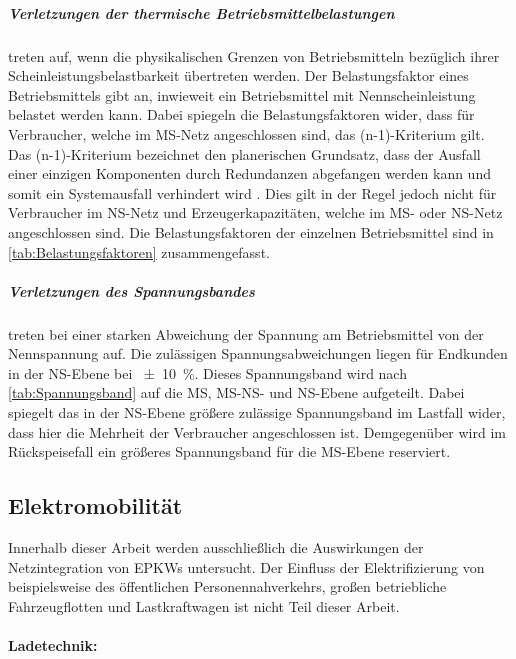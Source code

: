 \subparagraph{Verletzungen der thermische Betriebsmittelbelastungen} treten auf, wenn die physikalischen Grenzen von Betriebsmitteln bezüglich ihrer Scheinleistungsbelastbarkeit übertreten werden.
Der Belastungsfaktor eines Betriebsmittels gibt an, inwieweit ein Betriebsmittel mit Nennscheinleistung belastet werden kann.
Dabei spiegeln die Belastungsfaktoren wider, dass für Verbraucher, welche im \gls{MS}-Netz angeschlossen sind, das (n-1)-Kriterium  gilt.
Das (n-1)-Kriterium bezeichnet den planerischen Grundsatz, dass der Ausfall einer einzigen Komponenten durch Redundanzen abgefangen werden kann und somit ein Systemausfall verhindert wird \cite{NKG}.
Dies gilt in der Regel jedoch nicht für Verbraucher im \gls{NS}-Netz und Erzeugerkapazitäten, welche im \gls{MS}- oder \gls{NS}-Netz angeschlossen sind.
Die Belastungsfaktoren der einzelnen Betriebsmittel sind in \autoref{tab:Belastungsfaktoren} zusammengefasst. \cite{Schachler} \cite{Rehtanz2017}





\subparagraph{Verletzungen des Spannungsbandes} treten bei einer starken Abweichung der Spannung am Betriebsmittel von der Nennspannung auf.
Die zulässigen Spannungsabweichungen liegen für Endkunden in der \gls{NS}-Ebene bei \SI{\pm 10}{\percent}.
Dieses Spannungsband wird nach \autoref{tab:Spannungsband} auf die \gls{MS}, \gls{MS}-\gls{NS}- und \gls{NS}-Ebene aufgeteilt.
Dabei spiegelt das in der \gls{NS}-Ebene größere zulässige Spannungsband im Lastfall wider, dass hier die Mehrheit der Verbraucher angeschlossen ist.
Demgegenüber wird im Rückspeisefall ein größeres Spannungsband für die \gls{MS}-Ebene reserviert. \cite{Schachler} \cite{Rehtanz2017}




\subsection{Elektromobilität}

Innerhalb dieser Arbeit werden ausschließlich die Auswirkungen der Netzintegration von \glspl{EPKW} untersucht.
Der Einfluss der Elektrifizierung von beispielsweise des öffentlichen Personennahverkehrs, großen betriebliche Fahrzeugflotten und Lastkraftwagen ist nicht Teil dieser Arbeit.


\paragraph{Ladetechnik:}

